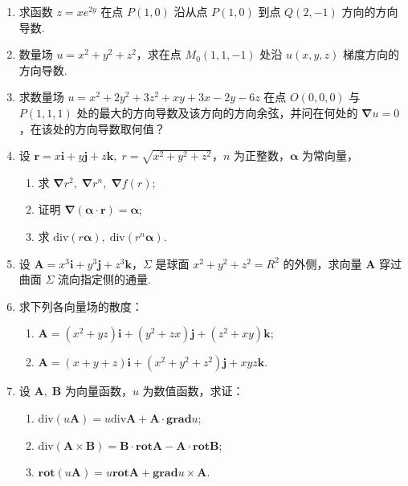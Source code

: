 \begin{enumerate}\setlength{\itemsep}{7pt}
    \item 求函数 $z=xe^{2y}$ 在点 $P(1, 0)$ 沿从点 $P(1, 0)$ 到点 $Q(2, -1)$ 方向的方向导数.
    \item 数量场 $u=x^2+y^2+z^2$，求在点 $M_0(1, 1, -1)$ 处沿 $u(x, y, z)$ 梯度方向的方向导数.
    \item 求数量场 $u=x^2+2y^2+3z^2+xy+3x-2y-6z$ 在点 $O(0, 0, 0)$ 与 $P(1, 1, 1)$ 处的最大的方向导数及该方向的方向余弦，并问在何处的 $\boldsymbol{\nabla} u=0$，在该处的方向导数取何值？
    \item 设 $\boldsymbol{r}=x\boldsymbol{i}+y\boldsymbol{j}+z\boldsymbol{k},\;r=\sqrt{x^2+y^2+z^2}$，$n$ 为正整数，$\boldsymbol{\alpha}$ 为常向量，
    \begin{enumerate}[(1)]\setlength{\itemsep}{5pt}\setlength{\topsep}{15pt}
        \item 求 $\boldsymbol{\nabla} r^2,\;\boldsymbol{\nabla}r^n,\;\boldsymbol{\nabla}f(r)$;
        \item 证明 $\boldsymbol{\nabla}(\boldsymbol{\alpha}\cdot \boldsymbol{r})=\boldsymbol{\alpha}$;
        \item 求 $\text{div}(r\boldsymbol{\alpha}),\;\text{div}(r^n\boldsymbol{\alpha})$.
    \end{enumerate}

    \item 设 $\boldsymbol{A}=x^3\boldsymbol{i}+y^3\boldsymbol{j}+z^3\boldsymbol{k}$，$\Sigma$ 是球面 $x^2+y^2+z^2=R^2$ 的外侧，求向量 $\boldsymbol{A}$ 穿过曲面 $\Sigma$ 流向指定侧的通量.
    
    \item 求下列各向量场的散度：
    \begin{enumerate}[(1)]\setlength{\itemsep}{5pt}\setlength{\topsep}{15pt}
        \item $\boldsymbol{A}=(x^2+yz)\boldsymbol{i}+(y^2+zx)\boldsymbol{j}+(z^2+xy)\boldsymbol{k}$;
        \item $\boldsymbol{A}=(x+y+z)\boldsymbol{i}+(x^2+y^2+z^2)\boldsymbol{j}+xyz\boldsymbol{k}$.
    \end{enumerate}
    
    \item 设 $\boldsymbol{A},\;\boldsymbol{B}$ 为向量函数，$u$ 为数值函数，求证：
    \begin{enumerate}[(1)]\setlength{\itemsep}{5pt}\setlength{\topsep}{15pt}
        \item $\text{div}(u\boldsymbol{A})=u\text{div}\boldsymbol{A}+\boldsymbol{A}\cdot\boldsymbol{grad}u$;
        \item $\text{div}(\boldsymbol{A}\times\boldsymbol{B})=\boldsymbol{B}\cdot\boldsymbol{rot}\boldsymbol{A}-\boldsymbol{A}\cdot\boldsymbol{rot}\boldsymbol{B}$;
        \item $\boldsymbol{rot}(u\boldsymbol{A}) = u\boldsymbol{rot}\boldsymbol{A}+\boldsymbol{grad} u\times \boldsymbol{A}$.
    \end{enumerate}
    

\end{enumerate}
